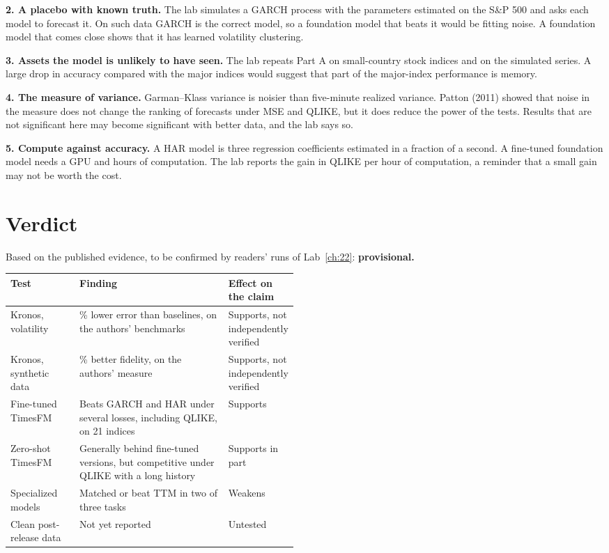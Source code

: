 \textbf{2. A placebo with known truth.} The lab simulates a GARCH process with the parameters estimated on the S\&P 500 and asks each model to forecast it. On such data GARCH is the correct model, so a foundation model that beats it would be fitting noise. A foundation model that comes close shows that it has learned volatility clustering.

\textbf{3. Assets the model is unlikely to have seen.} The lab repeats Part A on small-country stock indices and on the simulated series. A large drop in accuracy compared with the major indices would suggest that part of the major-index performance is memory.

\textbf{4. The measure of variance.} Garman--Klass variance is noisier than five-minute realized variance. Patton (2011) showed that noise in the measure does not change the ranking of forecasts under MSE and QLIKE, but it does reduce the power of the tests. Results that are not significant here may become significant with better data, and the lab says so.

\textbf{5. Compute against accuracy.} A HAR model is three regression coefficients estimated in a fraction of a second. A fine-tuned foundation model needs a GPU and hours of computation. The lab reports the gain in QLIKE per hour of computation, a reminder that a small gain may not be worth the cost.

\section{Verdict}
\label{sec:22-verdict}

Based on the published evidence, to be confirmed by readers' runs of Lab~\ref{ch:22}: \textbf{provisional.}

\begin{center}
\small
\begin{tabularx}{0.9\linewidth}{@{}>{\raggedright\arraybackslash}p{0.24\linewidth}>{\raggedright\arraybackslash}X>{\raggedright\arraybackslash}p{0.24\linewidth}@{}}
\toprule
Test & Finding & Effect on the claim \\
\midrule
Kronos, volatility & 9\% lower error than baselines, on the authors' benchmarks & Supports, not independently verified \\
Kronos, synthetic data & 22\% better fidelity, on the authors' measure & Supports, not independently verified \\
Fine-tuned TimesFM & Beats GARCH and HAR under several losses, including QLIKE, on 21 indices & Supports \\
Zero-shot TimesFM & Generally behind fine-tuned versions, but competitive under QLIKE with a long history & Supports in part \\
Specialized models & Matched or beat TTM in two of three tasks & Weakens \\
Clean post-release data & Not yet reported & Untested \\
\bottomrule
\end{tabularx}
\end{center}

